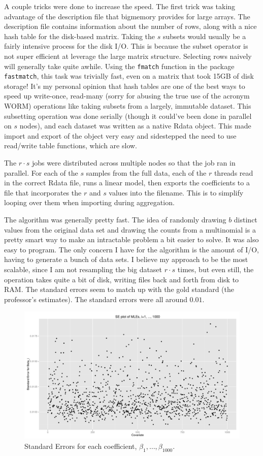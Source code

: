\documentclass[12pt]{article}
\begin{document}
A couple tricks were done to increase the speed. The first trick was taking advantage of the description file that bigmemory provides for large arrays. The description file contains information about the number of rows, along with a nice hash table for the disk-based matrix. Taking the $s$ subsets would usually be a fairly intensive process for the disk I/O. This is because the subset operator is not super efficient at leverage the large matrix structure. Selecting rows naively will generally take quite awhile. Using the \verb+fmatch+ function in the package \verb+fastmatch+, this task was trivially fast, even on a matrix that took 15GB of disk storage! It's my personal opinion that hash tables are one of the best ways to speed up write-once, read-many (sorry for abusing the true use of the acronym WORM) operations like taking subsets from a largely, immutable dataset. This subsetting operation was done serially (though it could've been done in parallel on $s$ nodes), and each dataset was written as a native Rdata object. This made import and export of the object very easy and sidestepped the need to use read/write table functions, which are slow.

The $r \cdot s$ jobs were distributed across multiple nodes so that the job ran in parallel. For each of the $s$ samples from the full data, each of the $r$ threads read in the correct Rdata file, runs a linear model, then exports the coefficients to a file that incorporates the $r$ and $s$ values into the filename. This is to simplify looping over them when importing during aggregation.

The algorithm was generally pretty fast. The idea of randomly drawing $b$ distinct values from the original data set and drawing the counts from a multinomial is a pretty smart way to make an intractable problem a bit easier to solve. It was also easy to program. The only concern I have for the algorithm is the amount of I/O, having to generate a bunch of data sets. I believe my approach to be the most scalable, since I am not resampling the big dataset $r \cdot s$ times, but even still, the operation takes quite a bit of disk, writing files back and forth from disk to RAM. The standard errors seem to match up with the gold standard (the professor's estimates). The standard errors were all around $0.01$.
\begin{figure}[H] \center
\includegraphics[scale=.55]{BLB/final/SD_plot.pdf}
\caption*{Standard Errors for each coefficient, $\beta_1, \dots, \beta_{1000}$.}
\end{figure}
\end{document}
